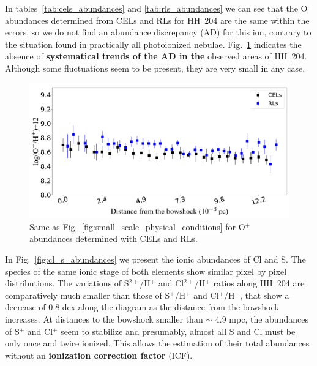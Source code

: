 \documentclass[twocolumn,linenumbers]{aastex63}
\newcommand{\jorge}[1]{{\color{magenta}J: #1}}
\begin{document}
In tables~\ref{tab:cels_abundances} and \ref{tab:rls_abundances} we can see that the O$^{+}$ abundances determined from CELs and RLs for  HH~204 are the same within the errors, so we do not find an abundance discrepancy (AD) for this ion, contrary to the situation found in practically all photoionized nebulae. Fig.~\ref{fig:O2_abundances_cels_rls} indicates the absence of {\bf systematical trends of the AD in the} observed areas of HH~204. Although some fluctuations seem to be present, they are very small in any case.%

\begin{figure}
\centering
\includegraphics[width=\columnwidth]{O2_cels_rls_distribution.pdf}
\caption{Same as Fig.~\ref{fig:small_scale_physical_conditions} for O$^{+}$ abundances determined with CELs and RLs.}
\label{fig:O2_abundances_cels_rls}
\end{figure}

In Fig.~\ref{fig:cl_s_abundances} we present the ionic abundances of Cl and S. The species of the same ionic stage of both elements show similar pixel by pixel distributions. The variations of S$^{2+}$/H$^+$ and Cl$^{2+}$/H$^+$ ratios along HH~204 are comparatively much smaller than those of S$^{+}$/H$^+$ and Cl$^{+}$/H$^+$, that show a decrease of 0.8 dex along the diagram as the distance from the bowshock increases. %
At distances to the bowshock smaller than $\sim$ 4.9 mpc, the abundances of S$^{+}$ and Cl$^{+}$ seem to stabilize and presumably, almost all S and Cl must be only once and twice ionized. This allows the estimation of their total abundances without an {\bf ionization correction factor} (ICF).
\end{document}

